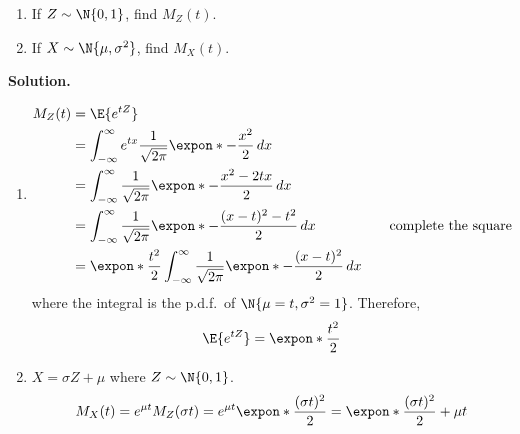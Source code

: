 \begin{Example}{}{}
    \begin{enumerate}[label=(\roman*)]
        \item If $ Z \sim \N{0,1} $, find $ M_Z(t) $.
        \item If $ X \sim \N{\mu,\sigma^2} $, find $ M_X(t) $.
    \end{enumerate}
    \textbf{Solution.}
    \begin{enumerate}[label=(\roman*)]
        \item \begin{align*}
                  M_Z(t)
                                                           & =\E{e^{tZ}}                                                                        \\
                                                           & =\int_{-\infty}^{\infty} e^{tx} \frac{1}{\sqrt{2\pi}}
                  \expon*{-\frac{x^2}{2}} \, d{x}                                                                                               \\
                                                           & =\int_{-\infty}^{\infty} \frac{1}{\sqrt{2\pi}}
                  \expon*{ -\frac{x^2-2tx}{2}} \, d{x}                                                                                          \\
                                                           & =\int_{-\infty}^{\infty} \frac{1}{\sqrt{2\pi}}
                  \expon*{ -\frac{(x-t)^2-t^2}{2}} \, d{x} & \quad                                                 & \text{complete the square} \\
                                                           & = \expon*{ \frac{t^2}{2}}
                  \int_{-\infty}^{\infty} \frac{1}{\sqrt{2\pi}}
                  \expon*{ -\frac{(x-t)^2}{2} } \, d{x}
              \end{align*}
              where the integral is the p.d.f.\ of $ \N{\mu=t,\sigma^2=1} $. Therefore,
              \[ \E{e^{tZ}}= \expon*{ \frac{t^2}{2}} \]

        \item $ X=\sigma Z+\mu $ where $ Z \sim \N{0,1} $.
              \[
                  M_X(t)
                  =e^{\mu t}M_Z(\sigma t)
                  =e^{\mu t} \expon*{ \frac{(\sigma t)^2}{2}}
                  = \expon*{ \frac{(\sigma t)^2}{2} +\mu t}
              \]
    \end{enumerate}
\end{Example}

